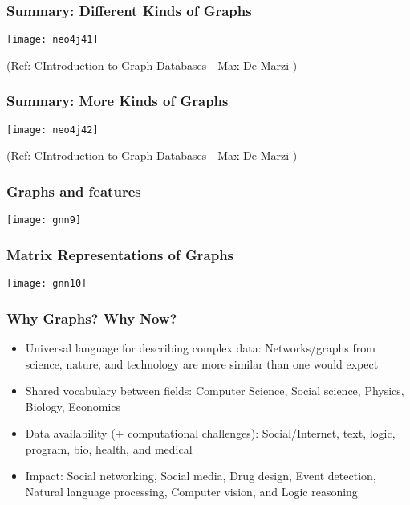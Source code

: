 \begin{frame}\frametitle{Summary: Different Kinds of Graphs}

\begin{center}
\texttt{[image: neo4j41]}
\end{center}
 

{\tiny (Ref: CIntroduction to Graph Databases - Max De Marzi )}
\end{frame}

\begin{frame}\frametitle{Summary: More Kinds of Graphs}

\begin{center}
\texttt{[image: neo4j42]}
\end{center}
 

{\tiny (Ref: CIntroduction to Graph Databases - Max De Marzi )}
\end{frame}


\begin{frame}[fragile]\frametitle{Graphs and features}

\begin{center}
\texttt{[image: gnn9]}
\end{center}	  

\end{frame}

\begin{frame}[fragile]\frametitle{Matrix Representations of Graphs}

\begin{center}
\texttt{[image: gnn10]}
\end{center}	  

\end{frame}

\begin{frame}[fragile]\frametitle{Why Graphs? Why Now?}

\begin{itemize}
\item Universal language for describing complex data: Networks/graphs from science, nature, and technology are more similar than one would expect
\item Shared vocabulary between fields: Computer Science, Social science, Physics, Biology, Economics 
\item Data availability (+ computational challenges): Social/Internet, text, logic, program, bio, health, and medical
\item Impact: Social networking, Social media, Drug design, Event detection, Natural language processing, Computer vision, and Logic reasoning
\end{itemize}

\end{frame}

